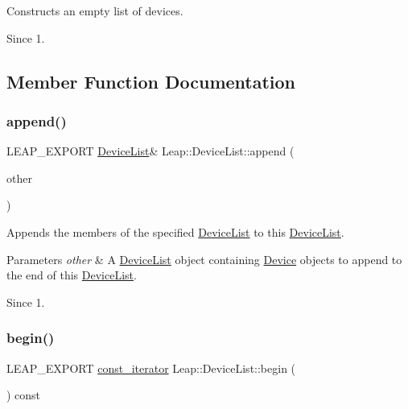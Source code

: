 Constructs an empty list of devices. \begin{DoxySince}{Since}
1. 
\end{DoxySince}


\subsection{Member Function Documentation}
\mbox{\label{class_leap_1_1_device_list_aa5a6dd4fcc38029bfd381e34bcae4c43}} 
\subsubsection{\texorpdfstring{append()}{append()}}
{\footnotesize\ttfamily L\+E\+A\+P\+\_\+\+E\+X\+P\+O\+RT \hyperlink{class_leap_1_1_device_list}{Device\+List}\& Leap\+::\+Device\+List\+::append (\begin{DoxyParamCaption}\item[{const \hyperlink{class_leap_1_1_device_list}{Device\+List} \&}]{other }\end{DoxyParamCaption})}

Appends the members of the specified \hyperlink{class_leap_1_1_device_list}{Device\+List} to this \hyperlink{class_leap_1_1_device_list}{Device\+List}. 
\begin{DoxyParams}{Parameters}
{\em other} & A \hyperlink{class_leap_1_1_device_list}{Device\+List} object containing \hyperlink{class_leap_1_1_device}{Device} objects to append to the end of this \hyperlink{class_leap_1_1_device_list}{Device\+List}. \\
\hline
\end{DoxyParams}
\begin{DoxySince}{Since}
1. 
\end{DoxySince}
\mbox{\label{class_leap_1_1_device_list_ad388e702535f69c3d09c699cb13f7e1e}} 
\subsubsection{\texorpdfstring{begin()}{begin()}}
{\footnotesize\ttfamily L\+E\+A\+P\+\_\+\+E\+X\+P\+O\+RT \hyperlink{class_leap_1_1_device_list_acfe5b07cda502759bf8fe768e8c6ba87}{const\+\_\+iterator} Leap\+::\+Device\+List\+::begin (\begin{DoxyParamCaption}{ }\end{DoxyParamCaption}) const}

